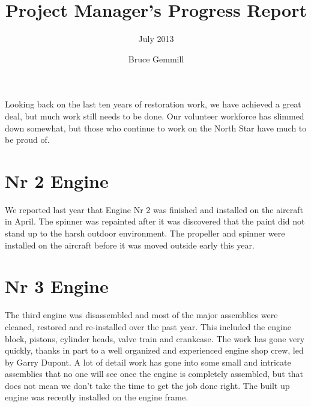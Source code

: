 %


\title{Project Manager's Progress Report}
\subtitle{July 2013}
\author{Bruce Gemmill}

\maketitle

Looking back on the last ten years of restoration work, we have
achieved a great deal, but much work still needs to be done.  Our
volunteer workforce has slimmed down somewhat, but those who continue
to work on the North Star have much to be proud of.

\section{Nr 2 Engine}
\label{sec:engines_2}

We reported last year that Engine Nr 2 was finished and installed on
the aircraft in April.  The spinner was repainted after it was
discovered that the paint did not stand up to the harsh outdoor
environment.  The propeller and spinner were installed on the aircraft
before it was moved outside early this year.

\section{Nr 3 Engine}
\label{sec:engines_3}

The third engine was disassembled and most of the major assemblies
were cleaned, restored and re-installed over the past year.  This
included the engine block, pistons, cylinder heads, valve train and
crankcase.  The work has gone very quickly, thanks in part to a well
organized and experienced engine shop crew, led by Garry Dupont.  A
lot of detail work has gone into some small and intricate assemblies
that no one will see once the engine is completely assembled, but that
does not mean we don't take the time to get the job done right.  The
built up engine was recently installed on the engine frame.


